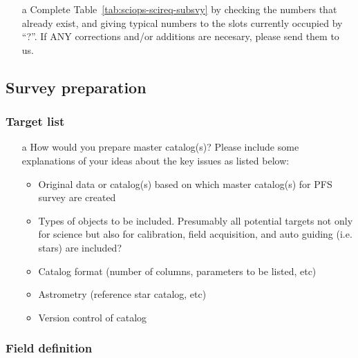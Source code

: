 \documentclass[a4paper,notitlepage]{article}
\newcommand{\colm}[1]{\textcolor{ccolm}{#1}}
\begin{document}
\begin{enumerate}
  \item[\colm{a}] Complete Table~\ref{tab:sciops-scireq-subsvy} by
           checking the numbers that already exist, and giving
           typical numbers to the slots currently occupied by
           ``?''. If ANY corrections and/or additions are necesary,
           please send them to us.
\end{enumerate}

\subsection{Survey preparation}

\subsubsection{Target list}

\begin{enumerate}
 \item[\colm{a}] How would you prepare master catalog(s)?  Please
          include some explanations of your ideas about the key
          issues as listed below:
          \begin{itemize}
           \item Original data or catalog(s) based on which master
             catalog(s) for PFS survey are created
           \item Types of objects to be included. Presumably all
             potential targets not only for science but also for
             calibration, field acquisition, and auto guiding
             (i.e. stars) are included?
           \item Catalog format (number of columns, parameters to be
             listed, etc)
           \item Astrometry (reference star catalog, etc)
           \item Version control of catalog
          \end{itemize}
\end{enumerate}

\subsubsection{Field definition}
\end{document}
